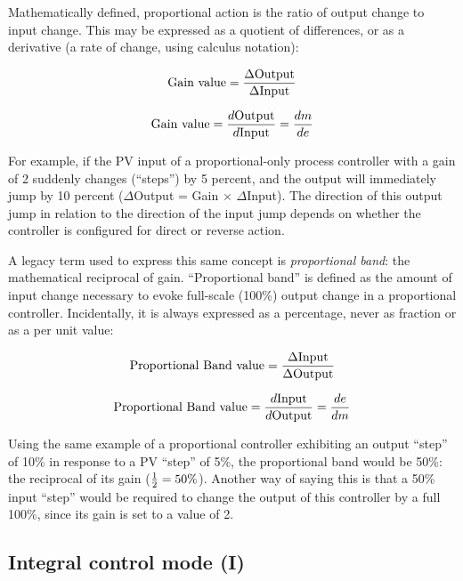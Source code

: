 \vskip 10pt

Mathematically defined, proportional action is the ratio of output change to input change.  This may be expressed as a quotient of differences, or as a derivative (a rate of change, using calculus notation): 

$$\hbox{Gain value} = {\Delta \hbox{Output} \over \Delta \hbox{Input}}$$

$$\hbox{Gain value} = {d\hbox{Output} \over d\hbox{Input}} = {dm \over de}$$

For example, if the PV input of a proportional-only process controller with a gain of 2 suddenly changes (``steps'') by 5 percent, and the output will immediately jump by 10 percent ($\Delta$Output = Gain $\times$ $\Delta$Input).  The direction of this output jump in relation to the direction of the input jump depends on whether the controller is configured for direct or reverse action.

A legacy term used to express this same concept is \textit{proportional band}: the mathematical reciprocal of gain.  ``Proportional band'' is defined as the amount of input change necessary to evoke full-scale (100\%) output change in a proportional controller.  Incidentally, it is always expressed as a percentage, never as fraction or as a per unit value:  

$$\hbox{Proportional Band value} = {\Delta \hbox{Input} \over \Delta \hbox{Output}}$$

$$\hbox{Proportional Band value} = {d\hbox{Input} \over d\hbox{Output}} = {de \over dm}$$

Using the same example of a proportional controller exhibiting an output ``step'' of 10\% in response to a PV ``step'' of 5\%, the proportional band would be 50\%: the reciprocal of its gain (${1 \over 2} = 50\%$).  Another way of saying this is that a 50\% input ``step'' would be required to change the output of this controller by a full 100\%, since its gain is set to a value of 2.

\vskip 10pt






\filbreak
\subsection{Integral control mode (I)}

